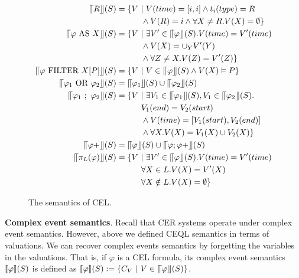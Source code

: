 \begin{figure}[t]
  \begin{align*}
    \InSBrackets{R}(S) &= \{V \ | \ V(time) = [i,i] \land t_{i}(type) = R\\
                       &\qquad\quad \land V(R) = {i} \land \forall X \ne R. V(X) = \emptyset \}\\
    \InSBrackets{\varphi \ \text{AS} \ X}(S) &= \{V \ | \ \exists V' \in \InSBrackets{\varphi}(S). V(time) = V'(time)\\
                       &\qquad\quad \land V(X) = \cup_{Y} V'(Y)\\
                       &\qquad\quad \land \forall Z \ne X. V(Z) = V'(Z)\}\\
    \InSBrackets{\varphi \ \text{FILTER} \ X[P]}(S) &= \{V \ | \ V \in \InSBrackets{\varphi}(S) \land V(X) \vDash P \}\\
    \InSBrackets{\varphi_{1} \ \text{OR} \ \varphi_{2}}(S) &= \InSBrackets{\varphi_{1}}(S) \cup \InSBrackets{\varphi_{2}}(S)\\
    \InSBrackets{\varphi_{1} \ ; \ \varphi_{2}}(S) &= \{V \ | \ \exists V_{1} \in \InSBrackets{\varphi_{1}}(S), V_{1} \in \InSBrackets{\varphi_{2}}(S).\\
                       &\qquad\quad  V_{1}(end) = V_{2}(start)\\
                       &\qquad\quad \land V(time) = [V_{1}(start), V_{2}(end)]\\
                       &\qquad\quad \land \forall X. V(X) = V_{1}(X) \cup V_{2}(X) \}\\
    \InSBrackets{\varphi+}(S) &= \InSBrackets{\varphi}(S) \cup \InSBrackets{\varphi;\varphi+}(S)\\
    \InSBrackets{\pi_{L}(\varphi)}(S) &= \{ V \ | \ \exists V' \in \InSBrackets{\varphi}(S). V(time) = V'(time)\\
                              &\qquad\quad \forall X \in L. V(X) = V'(X) \\
                              &\qquad\quad \forall X \notin L. V(X) = \emptyset \}
  \end{align*}
  \caption{The semantics of CEL.}
  \label{fig:cel:semantics}
\end{figure}

\textbf{Complex event semantics}. Recall that CER systems operate under complex event semantics. However, above we defined CEQL semantics in terms of valuations. We can recover complex events semantics by forgetting the variables in the valuations. That is, if $\varphi$ is a CEL formula, its complex event semantics $\llbracket \varphi \rrbracket(S)$ is defined as $\llbracket \varphi \rrbracket(S) := \{ C_{V} \ | \ V \in \llceil \varphi \rrfloor(S)\}$.

